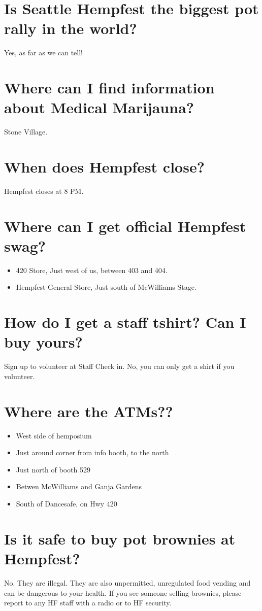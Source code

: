 \section{Is Seattle Hempfest the biggest pot rally in the world?}
Yes, as far as we can tell!

\section{Where can I find information about Medical Marijauna?}
Stone Village.

\section{When does Hempfest close?}
Hempfest closes at 8 PM. 

\section{Where can I get official Hempfest swag?}
\begin{itemize}
	\item 420 Store, Just west of us, between 403 and 404.
	\item Hempfest General Store, Just south of McWilliams Stage.
\end{itemize}

\section{How do I get a staff tshirt? Can I buy yours?}
Sign up to volunteer at Staff Check in. No, you can only get a shirt if  you volunteer.

\section{Where are the ATMs??}
\begin{itemize}
	\item West side of hemposium
	\item Just around corner from info booth, to the north
	\item Just north of booth 529
	\item Betwen McWilliams and Ganja Gardens
	\item South of Dancesafe, on Hwy 420
\end{itemize}

\section{Is it safe to buy pot brownies at Hempfest?}
No. They are illegal. They are also unpermitted, unregulated food vending and can be dangerous to your health. If you see someone selling brownies, please report to any HF staff with a radio or to HF security. 

